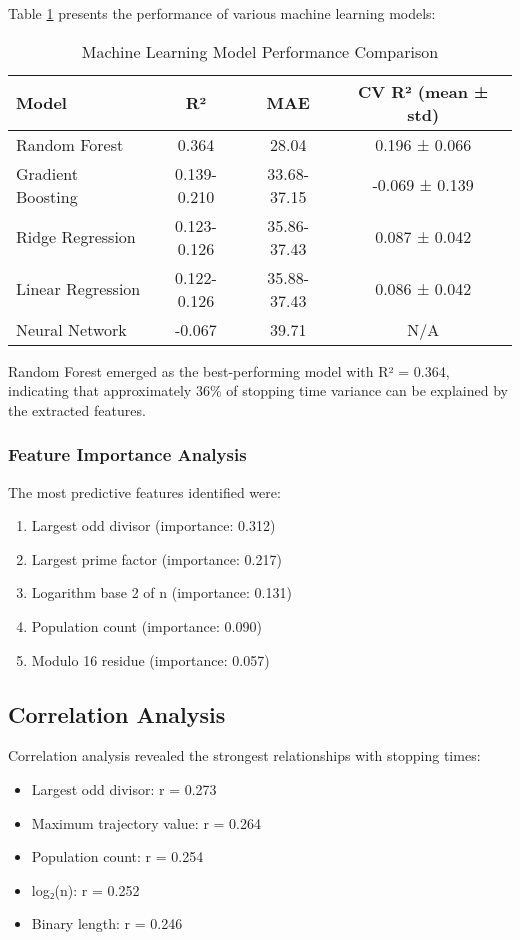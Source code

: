\documentclass[12pt,a4paper]{article}
\begin{document}
Table \ref{tab:ml_results} presents the performance of various machine learning models:

\begin{table}[H]
\centering
\caption{Machine Learning Model Performance Comparison}
\label{tab:ml_results}
\begin{tabular}{lccc}
\toprule
\textbf{Model} & \textbf{R²} & \textbf{MAE} & \textbf{CV R² (mean ± std)} \\
\midrule
Random Forest & 0.364 & 28.04 & 0.196 ± 0.066 \\
Gradient Boosting & 0.139-0.210 & 33.68-37.15 & -0.069 ± 0.139 \\
Ridge Regression & 0.123-0.126 & 35.86-37.43 & 0.087 ± 0.042 \\
Linear Regression & 0.122-0.126 & 35.88-37.43 & 0.086 ± 0.042 \\
Neural Network & -0.067 & 39.71 & N/A \\
\bottomrule
\end{tabular}
\end{table}

Random Forest emerged as the best-performing model with R² = 0.364, indicating that approximately 36\% of stopping time variance can be explained by the extracted features.

\subsubsection{Feature Importance Analysis}

The most predictive features identified were:
\begin{enumerate}
\item Largest odd divisor (importance: 0.312)
\item Largest prime factor (importance: 0.217)
\item Logarithm base 2 of n (importance: 0.131)
\item Population count (importance: 0.090)
\item Modulo 16 residue (importance: 0.057)
\end{enumerate}

\subsection{Correlation Analysis}

Correlation analysis revealed the strongest relationships with stopping times:
\begin{itemize}
\item Largest odd divisor: r = 0.273
\item Maximum trajectory value: r = 0.264
\item Population count: r = 0.254
\item log₂(n): r = 0.252
\item Binary length: r = 0.246
\end{itemize}
\end{document}
